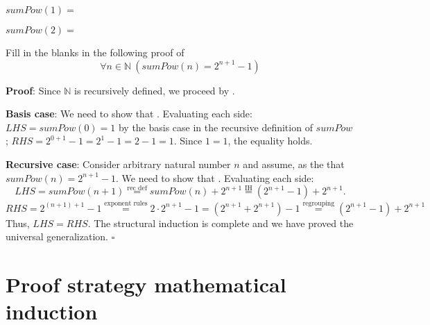 \documentclass[12pt, oneside]{article}
\begin{document}
\vspace{20pt}

$sumPow(1) =$

\vspace{20pt}

$sumPow(2) =$

\vspace{20pt}


Fill in the blanks in the following proof of 
\[
    \forall n \in \mathbb{N}~(sumPow(n) = 2^{n+1} - 1)
\]

{\bf Proof}: Since $\mathbb{N}$ is recursively defined, we proceed by \underline{}.

{\bf Basis case}: We need to show that \underline{}.
Evaluating each side: $LHS = sumPow(0) = 1$ by the basis case in the recursive definition
of $sumPow$; $RHS = 2^{0+1} - 1 = 2^1 - 1 = 2-1 = 1$. Since $1=1$, the equality holds.

{\bf Recursive case}: Consider arbitrary natural number $n$ and assume, as the 
\underline{\phantom{Induction Hypothesis (IH)}} that $sumPow(n) = 2^{n+1} - 1$. We need to show that
\underline{}.  Evaluating each side: 
\[
LHS = sumPow(n+1) \overset{\text{rec def}}{=} sumPow(n)  + 2^{n+1}\overset{\text{IH}}{=} (2^{n+1} - 1) + 2^{n+1}.
\]
\[
RHS = 2^{(n+1)+1}- 1 \overset{\text{exponent rules}}{=} 2 \cdot 2^{n+1} -1  = \left(2^{n+1} + 2^{n+1} \right) - 1
\overset{\text{regrouping}}{=}  (2^{n+1} - 1) + 2^{n+1} 
\]
Thus, $LHS = RHS$. The structural induction is complete and we have proved the universal generalization.
$\square$

 \vfill
\section*{Proof strategy mathematical induction}


 \vfill
\end{document}
